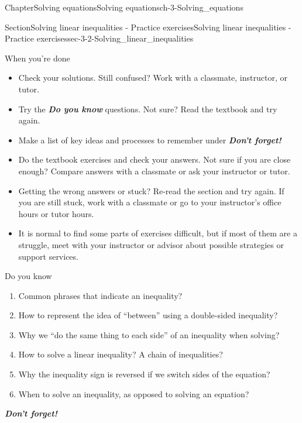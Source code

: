 \documentclass[twoside,11pt,]{book}
\newcommand{\alert}[1]{\textbf{\textit{#1}}}
\numberwithin{equation}{section}
\begin{document}
\begin{chapterptx}{Chapter}{Solving equations}{}{Solving equations}{}{}{ch-3-Solving_equations}
\begin{sectionptx}{Section}{Solving linear inequalities - Practice exercises}{}{Solving linear inequalities - Practice exercises}{}{}{sec-3-2-Solving_linear_inequalities}
\begin{conclusion}{When you're done \textellipsis{}}%
%
\begin{itemize}[label=\textbullet]
\item{}Check your solutions. Still confused? Work with a classmate, instructor, or tutor.%
\item{}Try the \alert{Do you know} questions. Not sure? Read the textbook and try again.%
\item{}Make a list of key ideas and processes to remember under \alert{Don't forget!}%
\item{}Do the textbook exercises and check your answers. Not sure if you are close enough? Compare answers with a classmate or ask your instructor or tutor.%
\item{}Getting the wrong answers or stuck? Re-read the section and try again. If you are still stuck, work with a classmate or go to your instructor's office hours or tutor hours.%
\item{}It is normal to find some parts of exercises difficult, but if most of them are a struggle, meet with your instructor or advisor about possible strategies or support services.%
\end{itemize}
%
\end{conclusion}%
\begin{conclusion}{Do you know \textellipsis{}}%
%
\begin{enumerate}[label={\Alph*.}]
\item{}Common phrases that indicate an inequality?%
\item{}How to represent the idea of ``between'' using a double-sided inequality?%
\item{}Why we ``do the same thing to each side'' of an inequality when solving?%
\item{}How to solve a linear inequality? A chain of inequalities?%
\item{}Why the inequality sign is reversed if we switch sides of the equation?%
\item{}When to solve an inequality, as opposed to solving an equation?%
\end{enumerate}
%
\par
\alert{Don't forget!}%
\end{conclusion}%
\end{sectionptx}
%
%
\typeout{************************************************}
\typeout{************************************************}
%

\end{chapterptx}
\end{document}
